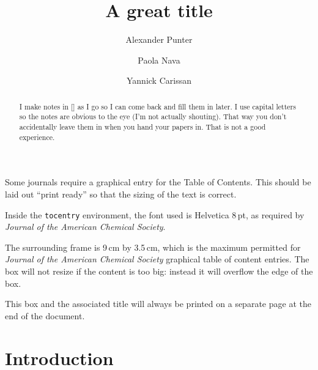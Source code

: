 \documentclass[journal=jctcce,manuscript=article]{achemso}
\author{Alexander Punter}
\author{Paola Nava}
\author{Yannick Carissan}
\affiliation[Aix-Marseille University]
{Aix Marseille Univ, CNRS, Centrale Marseille, iSm2, Marseille, France}
\title[A great title]
  {A great title}
\begin{document}
\begin{tocentry}

Some journals require a graphical entry for the Table of Contents.
This should be laid out ``print ready'' so that the sizing of the
text is correct.

Inside the \texttt{tocentry} environment, the font used is Helvetica
8\,pt, as required by \emph{Journal of the American Chemical
Society}.

The surrounding frame is 9\,cm by 3.5\,cm, which is the maximum
permitted for  \emph{Journal of the American Chemical Society}
graphical table of content entries. The box will not resize if the
content is too big: instead it will overflow the edge of the box.

This box and the associated title will always be printed on a
separate page at the end of the document.

\end{tocentry}

\begin{abstract}
I make notes in [] as I go so I can come back and fill them in later. I use capital letters so the notes are obvious to the eye (I'm not actually shouting). That way you don't accidentally leave them in when you hand your papers in. That is not a good experience.
\end{abstract}

\section{Introduction}

\newcommand{\showCustomItem}{\refstepcounter{customItem}\roman{customItem}}
\end{document}
